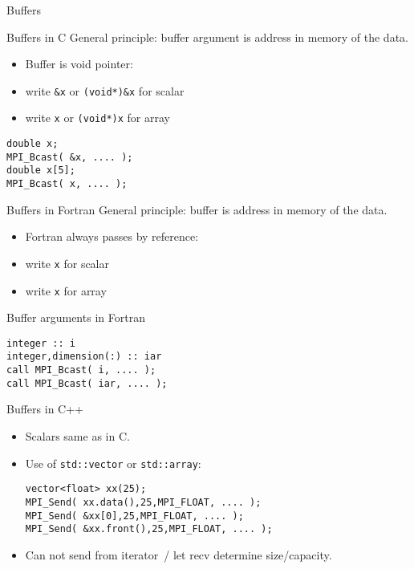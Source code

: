 
\begin{exerciseframe}[randommax]
  
\end{exerciseframe}

 {Buffers}

\begin{c}
\begin{numberedframe}{Buffers in C}
  General principle: buffer argument is address in memory of the data.
  \begin{itemize}
  \item Buffer is void pointer: 
  \item write \lstinline{&x} or \lstinline{(void*)&x} for scalar
  \item write \lstinline{x} or \lstinline{(void*)x} for array
  \end{itemize}
\begin{lstlisting}
double x;
MPI_Bcast( &x, .... );
double x[5];
MPI_Bcast( x, .... );
\end{lstlisting}
\end{numberedframe}
\end{c}

\begin{fortran}
  \addtocounter{slidecount}{-1}
\begin{numberedframe}{Buffers in Fortran}
  General principle: buffer is address in memory of the data.
  \begin{itemize}
  \item Fortran always passes by reference:
  \item write \lstinline{x} for scalar
  \item write \lstinline{x} for array
  \end{itemize}
\end{numberedframe}
\begin{numberedframe}{Buffer arguments in Fortran}
\begin{lstlisting}
integer :: i
integer,dimension(:) :: iar
call MPI_Bcast( i, .... );
call MPI_Bcast( iar, .... );
\end{lstlisting}
\end{numberedframe}
\end{fortran}

\begin{cxx}
\begin{numberedframe}{Buffers in C++}
 \lstset{language=C++}
  \begin{itemize}
  \item Scalars same as in C.
  \item Use of \lstinline+std::vector+ or \lstinline+std::array+:
\begin{lstlisting}
vector<float> xx(25);
MPI_Send( xx.data(),25,MPI_FLOAT, .... );
MPI_Send( &xx[0],25,MPI_FLOAT, .... );
MPI_Send( &xx.front(),25,MPI_FLOAT, .... );
\end{lstlisting}
\item Can not send from iterator~/
  let recv determine size/capacity.
  \end{itemize}
 \lstset{language=C}
\end{numberedframe}
\end{cxx}

